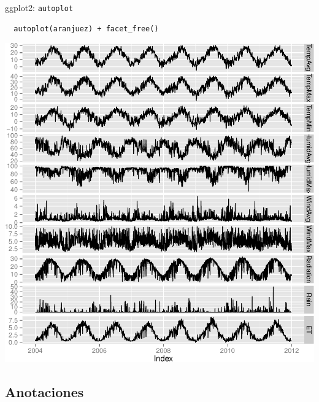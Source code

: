 \documentclass[xcolor={usenames,svgnames,dvipsnames}]{beamer}
\begin{document}
\begin{frame}[fragile,label=sec-2-2-3]{ggplot2: \texttt{autoplot}}
 \lstset{language=R,label= ,caption= ,numbers=none}
\begin{lstlisting}
  autoplot(aranjuez) + facet_free()
\end{lstlisting}
\end{frame}
\begin{frame}[label=sec-2-2-4]{}
\includegraphics[width=.9\linewidth]{figs/aranjuezGG.pdf}
\end{frame}

\subsection{Anotaciones}
\label{sec-2-3}
\end{document}
